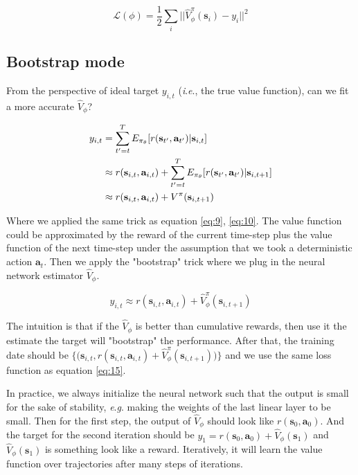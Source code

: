 \documentclass{tufte-handout}
\newcommand{\ie}{\textit{i}.\textit{e}., }
\newcommand{\eg}{\textit{e}.\textit{g}. }
\newcommand{\s}{\mathbf{s}}
\newcommand{\act}{\mathbf{a}}
\begin{document}
\begin{equation}
\label{eq:15}
\mathcal{L}(\phi) = \frac{1}{2} \sum_i \Big|\Big|\hat{V} ^\pi _\phi (\s_i) - y_i \Big|\Big| ^ 2
\end{equation}

\subsection{Bootstrap mode}

From the perspective of ideal target $y_{i,t}$ (\ie the true value function), can we fit a more accurate $\hat{V}_\phi$?

\begin{align}
\label{eq:16}
y_{i,t} & = \sum_{t'=t} ^ T E_{\pi_\theta} [r(\s_{t'}, \act_{t'}) | \s_{i,t}] \notag \\
& \approx r(\s_{i,t}, \act_{i,t}) +\sum_{t'=t} ^ T E_{\pi_\theta} [r(\s_{t'}, \act_{t'}) | \s_{i,t + 1}] \notag \\
& \approx r(\s_{i,t}, \act_{i,t}) + V^\pi (\s_{i, t+1})
\end{align}

Where we applied the same trick as equation \ref{eq:9}, \ref{eq:10}. The value function could be approximated by the reward of the current time-step plus the value function of the next time-step under the assumption that we took a deterministic action $\act_t$. Then we apply the "bootstrap" trick where we plug in the neural network estimator $\hat{V}_\phi$.

\begin{equation}
\label{eq:17}
y_{i,t} \approx
r(\s_{i,t}, \act_{i,t}) + \hat{V}^\pi _ \phi (\s_{i, t+1})
\end{equation}

The intuition is that if the $\hat{V}_\phi$ is better than cumulative rewards, then use it the estimate the target will "bootstrap" the performance. After
that, the training date should be $\Big\{\Big(\s_{i,t}, r(\s_{i,t}, \act_{i,t}) + \hat{V}^\pi _ \phi (\s_{i, t+1}) \Big) \Big\}$ and we use the same loss function as equation \ref{eq:15}.

In practice, we always initialize the neural network such that the output is small for the sake of stability, \eg making the weights of the last linear layer to be small. Then for the first step, the output of $\hat{V}_\phi$ should look like $r(\s_0, \act_0)$. And the target for the second iteration should be $y_1 = r(\s_0, \act_0) + \hat{V}_\phi(\s_1)$ and $\hat{V}_\phi(\s_1)$ is something look like a reward. Iteratively, it will learn the value function over trajectories after many steps of iterations.
\end{document}
